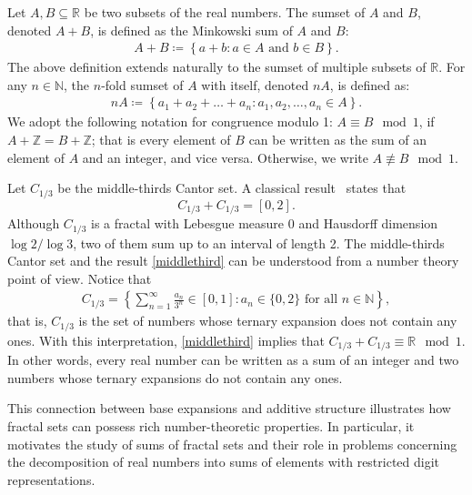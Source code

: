 \documentclass{ws-ijnt}
\begin{document}
	Let $A,B\subseteq \mathbb{R}$ be two subsets of the real numbers. The sumset of $A$ and $B$, denoted $A+B$, is defined as the Minkowski sum of $A$ and $B$:
	\begin{align*}
		A+B
		\coloneqq
		\left\{a+b : a\in A \text{ and } b\in B\right\}.
	\end{align*}
	The above definition extends naturally to the sumset of multiple subsets of $\mathbb{R}$. For any $n\in\mathbb{N}$, the $n$-fold sumset of $A$ with itself, denoted $nA$, is defined as:
	\begin{align*}
		n A\coloneqq \left\{a_1+a_2+\dots+a_n:a_1,a_2,\ldots,a_n\in A\right\}.
	\end{align*}
	We adopt the following notation for congruence modulo 1: $A\equiv B\mod1$, if $A+\mathbb{Z}=B+\mathbb{Z}$; that is every element of $B$ can be written as the sum of an element of $A$ and an integer, and vice versa. Otherwise, we write $A\not\equiv B\mod1$.
	
	Let $C_{1/3}$ be the middle-thirds Cantor set. A classical result~\cite{randolph1940, steinhaus1920} states that 
	\begin{equation}\label{middlethird}
		C_{1/3}+C_{1/3} = [0,2].
	\end{equation}
	Although $C_{1/3}$ is a fractal with Lebesgue measure $0$ and Hausdorff dimension $\log{2}/\log{3}$, two of them sum up to an interval of length 2. The middle-thirds Cantor set and the result \eqref{middlethird} can be understood from a number theory point of view. Notice that
	\begin{align*}
		C_{1/3}
		=\left\{\sum_{n=1}^{\infty} \frac{a_n}{3^n}\in[0,1]:a_n\in\{0,2\}\text{ for all $n\in\mathbb{N}$}\right\},
	\end{align*}
	that is, $C_{1/3}$ is the set of numbers whose ternary expansion does not contain any ones. With this interpretation, \eqref{middlethird} implies that $C_{1/3}+C_{1/3} \equiv\mathbb{R}\mod1$. In other words, every real number can be written as a sum of an integer and two numbers whose ternary expansions do not contain any ones.
	
	This connection between base expansions and additive structure illustrates how fractal sets can possess rich number-theoretic properties. In particular, it motivates the study of sums of fractal sets and their role in problems concerning the decomposition of real numbers into sums of elements with restricted digit representations.
	
\end{document}
